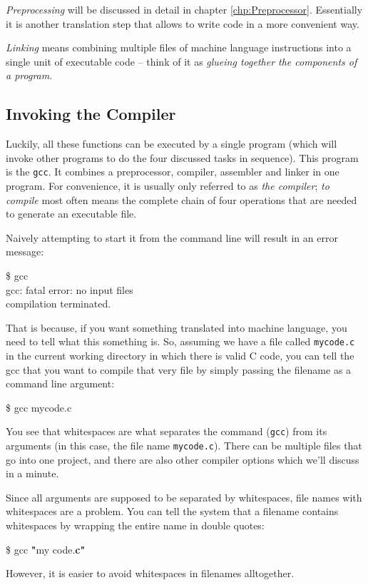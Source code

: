 \emph{Preprocessing} will be discussed in detail in chapter \ref{chp:Preprocessor}. Essentially it is another translation step that allows to write code in a more convenient way.

\emph{Linking} means combining multiple files of machine language instructions into a single unit of executable code -- think of it as \emph{glueing together the components of a program}.

\subsection{Invoking the Compiler}
Luckily, all these functions can be executed by a single program (which will invoke other programs to do the four discussed tasks in sequence). This program is the \texttt{gcc}. It combines a preprocessor, compiler, assembler and linker in one program. For convenience, it is usually only referred to as \emph{the compiler}; \emph{to compile} most often means the complete chain of four operations that are needed to generate an executable file.

Naively attempting to start it from the command line will result in an error message:
\begin{cmdbox}
\$ gcc\\
gcc: {\color{red}fatal error}: no input files\\
compilation terminated.
\end{cmdbox}

That is because, if you want something translated into machine language, you need to tell what this something is. So, assuming we have a file called \texttt{mycode.c} in the current working directory in which there is valid C code, you can tell the gcc that you want to compile that very file by simply passing the filename as a command line argument:
\begin{cmdbox}
\$ gcc mycode.c
\end{cmdbox}

\begin{warnbox}
You see that whitespaces are what separates the command (\texttt{gcc}) from its arguments (in this case, the file name \texttt{mycode.c}). There can be multiple files that go into one project, and there are also other compiler options which we'll discuss in a minute.

Since all arguments are supposed to be separated by whitespaces, file names with whitespaces are a problem. You can tell the system that a filename contains whitespaces by wrapping the entire name in double quotes:
\begin{cmdbox}
\$ gcc \textbf{"}my code.\textbf{c"}
\end{cmdbox}

However, it is easier to avoid whitespaces in filenames alltogether.
\end{warnbox}

